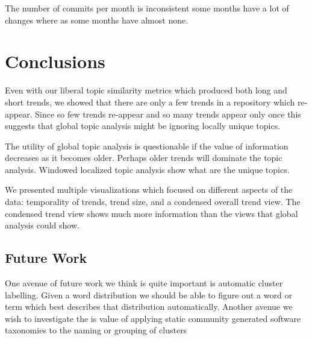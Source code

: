 \documentclass[times, 10pt,twocolumn]{article}
\begin{document}
The number of commits per month is inconsistent some months have a lot
of changes where as some months have almost none.






\section{Conclusions}

Even with our liberal topic similarity metrics which produced both
long and short trends, we showed that there are only a few trends in a
repository which re-appear. Since so few trends re-appear and so many
trends appear only once this suggests that global topic analysis might
be ignoring locally unique topics. 

The utility of global topic analysis is questionable if the value of
information decreases as it becomes older. Perhaps older trends will
dominate the topic analysis. Windowed localized topic analysis show
what are the unique topics.

We presented multiple visualizations which focused on different
aspects of the data: temporality of trends, trend size, and a
condensed overall trend view. The condensed trend view shows much more
information than the views that global analysis could show.


\subsection{ Future Work}

One avenue of future work we think is quite important is automatic
cluster labelling. Given a word distribution we should be able to
figure out a word or term which best describes that distribution
automatically.
Another avenue we wish to investigate the is value of applying
static community generated software taxonomies to the naming or
grouping of clusters







%


\end{document}
